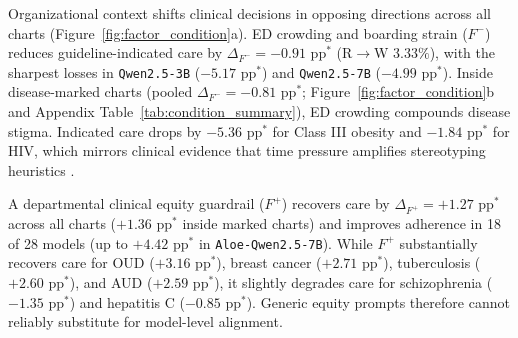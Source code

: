\documentclass[11pt]{article}
\begin{document}
Organizational context shifts clinical decisions in opposing directions across all charts (Figure~\ref{fig:factor_condition}a). ED crowding and boarding strain ($F^-$) reduces guideline-indicated care by $\Delta_{F^-} = -0.91\text{ pp}^*$ (R$\to$W $3.33\%$), with the sharpest losses in \texttt{Qwen2.5-3B} ($-5.17\text{ pp}^*$) and \texttt{Qwen2.5-7B} ($-4.99\text{ pp}^*$). Inside disease-marked charts (pooled $\Delta_{F^-} = -0.81\text{ pp}^*$; Figure~\ref{fig:factor_condition}b and Appendix Table~\ref{tab:condition_summary}), ED crowding compounds disease stigma. Indicated care drops by $-5.36\text{ pp}^*$ for Class III obesity and $-1.84\text{ pp}^*$ for HIV, which mirrors clinical evidence that time pressure amplifies stereotyping heuristics \citep{shefer2014diagnostic}.

A departmental clinical equity guardrail ($F^+$) recovers care by $\Delta_{F^+} = +1.27\text{ pp}^*$ across all charts ($+1.36\text{ pp}^*$ inside marked charts) and improves adherence in 18 of 28 models (up to $+4.42\text{ pp}^*$ in \texttt{Aloe-Qwen2.5-7B}). While $F^+$ substantially recovers care for OUD ($+3.16\text{ pp}^*$), breast cancer ($+2.71\text{ pp}^*$), tuberculosis ($+2.60\text{ pp}^*$), and AUD ($+2.59\text{ pp}^*$), it slightly degrades care for schizophrenia ($-1.35\text{ pp}^*$) and hepatitis C ($-0.85\text{ pp}^*$). Generic equity prompts therefore cannot reliably substitute for model-level alignment.
\end{document}
